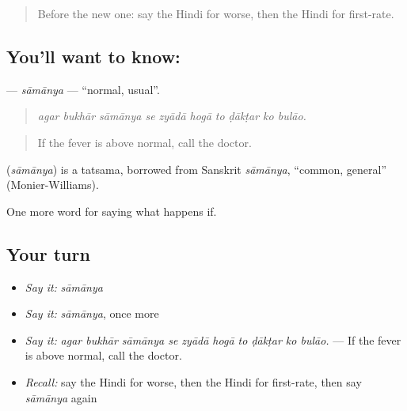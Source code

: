 \label{lesson:HI-C389-samanya}



\begin{quote}
Before the new one: say the Hindi for worse, then the Hindi for first-rate.
\end{quote}

\subsection*{You'll want to know: }
\textbf{} — \emph{sāmānya} — \textquotedblleft{}normal, usual\textquotedblright{}.

\begin{quote}
         
\end{quote}

\begin{quote}
\emph{agar bukhār sāmānya se zyādā hogā to ḍākṭar ko bulāo.}
\end{quote}

\begin{quote}
If the fever is above normal, call the doctor.
\end{quote}

\begin{cousinweb}
\textbf{} (\emph{sāmānya}) is a tatsama, borrowed from Sanskrit \emph{sāmānya}, \textquotedblleft{}common, general\textquotedblright{} (Monier-Williams).
\end{cousinweb}

\begin{grammarlens}[title={What you've built}]
One more word for saying what happens if.
\end{grammarlens}

\subsection*{Your turn}
\begin{itemize}
\raggedright
  \item \emph{Say it:} \emph{sāmānya}
  \item \emph{Say it:} \emph{sāmānya}, once more
  \item \emph{Say it:} \emph{agar bukhār sāmānya se zyādā hogā to ḍākṭar ko bulāo.} — If the fever is above normal, call the doctor.
  \item \emph{Recall:} say the Hindi for worse, then the Hindi for first-rate, then say \emph{sāmānya} again
\end{itemize}

